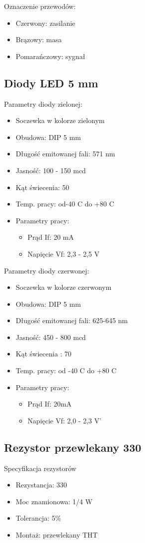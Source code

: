 \documentclass{classrep}
\begin{document}
Oznaczenie przewodów:
\begin{itemize}
  \item Czerwony: zasilanie
  \item Brązowy: masa
  \item Pomarańczowy: sygnał
\end{itemize}

\subsection {Diody LED 5 mm}
Parametry diody zielonej:
\begin{itemize}
  \item Soczewka w kolorze zielonym
  \item Obudowa: DIP 5 mm
  \item Długość emitowanej fali: 571 nm
  \item Jasność: 100 - 150 mcd
  \item Kąt świecenia: 50\degree
  \item Temp. pracy: od-40 \degree C do +80 \degree C
  \item Parametry pracy:
\begin{itemize}
  \item Prąd If: 20 mA
  \item Napięcie Vf: 2,3 - 2,5 V\\
\end{itemize}
\end{itemize}

Parametry diody czerwonej:
\begin{itemize}
  \item Soczewka w kolorze czerwonym
  \item Obudowa: DIP 5 mm
  \item Długość emitowanej fali: 625-645 nm
  \item Jasność: 450 - 800 mcd
  \item Kąt świecenia : 70 \degree
  \item Temp. pracy: od -40 \degree C do +80 \degree C
  \item Parametry pracy:
\begin{itemize}
  \item Prąd If: 20mA
  \item Napięcie Vf: 2,0 - 2,3 V'
\end{itemize}
\end{itemize}

\subsection {Rezystor przewlekany 330 \ohm}
Specyfikacja rezystorów
\begin{itemize}
  \item Rezystancja: 330 \ohm
  \item Moc znamionowa: 1/4 W
  \item Tolerancja: 5\%
  \item Montaż: przewlekany THT
\end{itemize}
\end{document}
